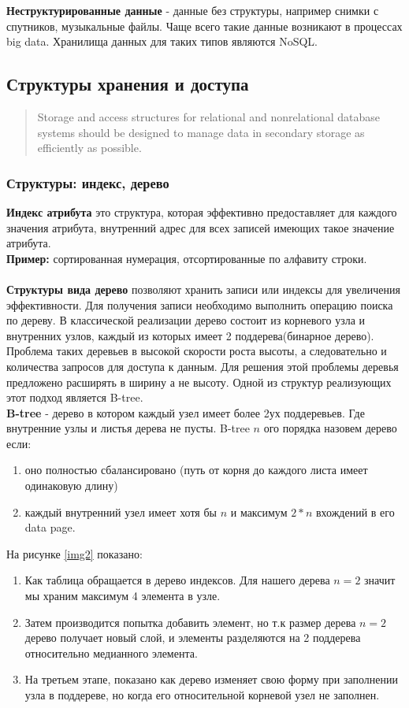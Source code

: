 \documentclass{article}
\begin{document}
\textbf{Неструктурированные данные} - данные без структуры, например снимки с спутников, музыкальные файлы. Чаще всего такие данные возникают в процессах big data. Хранилища данных для таких типов являются NoSQL.


\subsection{Структуры хранения и доступа}
\begin{quote}
    Storage and access structures for relational and nonrelational database systems should 
    be designed to manage data in secondary storage as efficiently as possible.
\end{quote}

\subsubsection{Структуры: индекс, дерево}
\textbf{Индекс атрибута} это структура, которая эффективно предоставляет для каждого значения атрибута, внутренний адрес для всех записей имеющих такое значение атрибута.\\
\textbf{Пример:} сортированная нумерация, отсортированные по алфавиту строки.\\\\
\textbf{Структуры вида дерево} позволяют хранить записи или индексы для увеличения эффективности. Для получения записи необходимо выполнить операцию поиска по дереву.
В классической реализации дерево состоит из корневого узла и внутренних узлов, каждый из которых имеет 2 поддерева(бинарное дерево).
Проблема таких деревьев в высокой скорости роста высоты, а следовательно и количества запросов для доступа к данным. Для решения этой проблемы деревья предложено расширять в ширину а не высоту.
Одной из структур реализующих этот подход является B-tree.\\
\textbf{B-tree} - дерево в котором каждый узел имеет более 2ух поддеревьев. Где внутренние узлы и листья дерева не пусты.
B-tree $n$ ого порядка назовем дерево если:
\begin{enumerate}
    \item оно полностью сбалансировано (путь от корня до каждого листа имеет одинаковую длину)
    \item каждый внутренний узел имеет хотя бы $n$ и максимум $2*n$ вхождений в его data page.
\end{enumerate}
На рисунке \ref{img2} показано:
\begin{enumerate}
    \item Как таблица обращается в дерево индексов. Для нашего дерева $n = 2$ значит мы храним максимум 4 элемента в узле.
    \item Затем производится попытка добавить элемент, но т.к размер дерева $n = 2$ дерево получает новый слой, и элементы разделяются на 2 поддерева относительно медианного элемента.
    \item На третьем этапе, показано как дерево изменяет свою форму при заполнении узла в поддереве, но когда его относительной корневой узел не заполнен.
\end{enumerate} 
\end{document}
